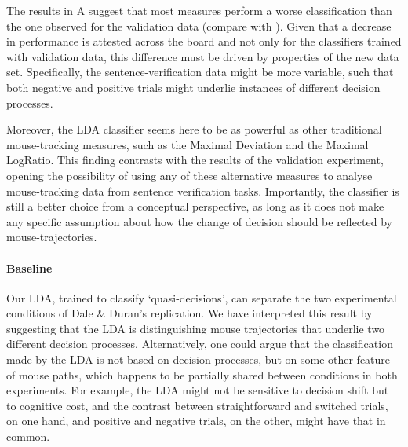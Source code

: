 \documentclass{article}
\begin{document}
The results in A suggest that most measures perform a worse classification than the one observed for the validation data (compare with ). 
Given that a decrease in performance is attested across the board and not only for the classifiers trained with validation data, 
this difference must be driven by properties of the new data set. Specifically, the sentence-verification data might be more variable, such that both negative and positive trials might underlie instances of different decision processes. 

Moreover, the LDA classifier seems here to be as powerful as other traditional mouse-tracking measures, such as the Maximal Deviation and the Maximal LogRatio. This finding contrasts with the results of the validation experiment, opening the possibility of using any of these alternative measures to analyse mouse-tracking data from sentence verification tasks. Importantly, the classifier is still a better choice from a conceptual perspective, as long as it does not make any specific assumption about how the change of decision should be reflected by mouse-trajectories.  

\paragraph{Baseline}
Our LDA, trained to classify `quasi-decisions', can separate the two experimental conditions of Dale \& Duran's replication. We have interpreted this result by suggesting that the LDA is distinguishing mouse trajectories that underlie two different decision processes. 
Alternatively, one could argue that the classification made by the LDA is not based on decision processes, but on some other feature of mouse paths, which happens to be partially shared between conditions in both experiments. 
For example, the LDA might not be sensitive to decision shift but to cognitive cost, and the contrast between straightforward and switched trials, on one hand, and positive and negative trials, on the other, might have that in common. 
\end{document}
